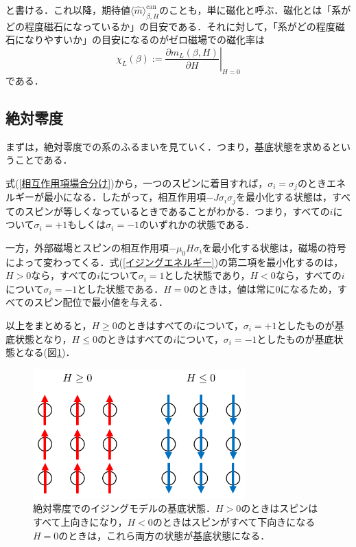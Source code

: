 \documentclass[a4paper,11pt]{jsreport}
\begin{document}
と書ける．これ以降，期待値$\langle \hat{m} \rangle_{\beta, H}^{\text{can}}$のことも，単に磁化と呼ぶ．磁化とは「系がどの程度磁石になっているか」の目安である．それに対して，「系がどの程度磁石になりやすいか」の目安になるのがゼロ磁場での磁化率は
\begin{equation}
  \chi_L(\beta) := \left.\frac{\partial m_L(\beta, H)}{\partial H}\right|_{H=0}
\end{equation}
である．
\subsection{絶対零度}
まずは，絶対零度での系のふるまいを見ていく．つまり，基底状態を求めるということである．\par
式(\ref{相互作用項場合分け})から，一つのスピンに着目すれば，$\sigma_i = \sigma_j$のときエネルギーが最小になる．したがって，相互作用項$-J\sigma_i \sigma_j$を最小化する状態は，すべてのスピンが等しくなっているときであることがわかる．つまり，すべての$i$について$\sigma_i = +1$もしくは$\sigma_i = -1$のいずれかの状態である．\par
一方，外部磁場とスピンの相互作用項$-\mu_0 H \sigma_i$を最小化する状態は，磁場の符号によって変わってくる．式(\ref{イジングエネルギー})の第二項を最小化するのは，$H>0$なら，すべての$i$について$\sigma_i=1$とした状態であり，$H<0$なら，すべての$i$について$\sigma_i=-1$とした状態である．$H=0$のときは，値は常に$0$になるため，すべてのスピン配位で最小値を与える．\par
以上をまとめると，$H \geq 0$のときはすべての$i$について，$\sigma_i=+1$としたものが基底状態となり，$H \leq 0$のときはすべての$i$について，$\sigma_i=-1$としたものが基底状態となる(図\ref{絶対零度スピン配位})．\par
\begin{figure}[h]
  \begin{center}
    \includegraphics[height=5cm]{image/絶対零度スピン配位.png}
    \caption{絶対零度でのイジングモデルの基底状態．$H>0$のときはスピンはすべて上向きになり，$H<0$のときはスピンがすべて下向きになる$H=0$のときは，これら両方の状態が基底状態になる． \label{絶対零度スピン配位}}
  \end{center}
\end{figure}
\end{document}
